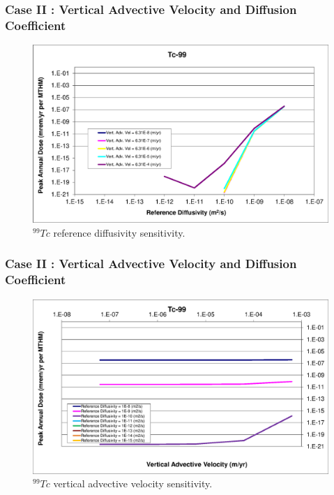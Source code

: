 \begin{frame}[c]
  \frametitle{Case II : Vertical Advective Velocity and Diffusion Coefficient}
\begin{figure}[htp!]
\centering
\includegraphics[width=\linewidth]{AdvVelAndDiffCoeffEBSFail/Tc-99.eps}
\caption{$^{99}Tc$ reference diffusivity sensitivity.}
\label{fig:VAdvVelTc99}
\end{figure}
\end{frame}

\begin{frame}[c]
  \frametitle{Case II : Vertical Advective Velocity and Diffusion Coefficient}
\begin{figure}[ht!]
\centering
\includegraphics[width=\linewidth]{AdvVelAndDiffCoeffEBSFail/Tc-99-VAdvVel.eps}
\caption{$^{99}Tc$ vertical advective velocity sensitivity.}
\label{fig:VAdvVelTc99VAdvVel}
\end{figure}
\end{frame}


